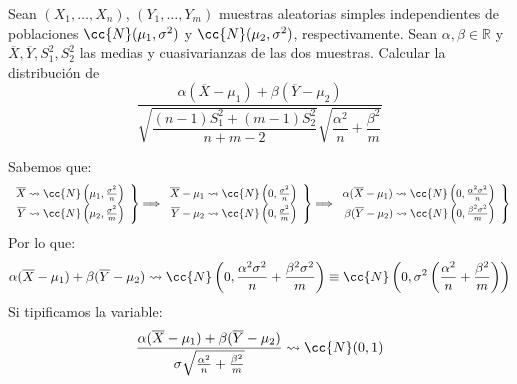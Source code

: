 \begin{ejercicio}
    Sean $(X_1, \ldots, X_n)$, $(Y_1, \ldots, Y_m)$ muestras aleatorias simples independientes de poblaciones $\cc{N}(\mu_1,\sigma^2)$ y $\cc{N}(\mu_2, \sigma^2)$, respectivamente. Sean $\alpha,\beta\in \mathbb{R}$ y $\overline{X},\overline{Y},S_1^2, S_2^2$ las medias y cuasivarianzas de las dos muestras. Calcular la distribución de
    \begin{equation*}
        \dfrac{\alpha\left(\overline{X}-\mu_1\right)+\beta\left(\overline{Y}-\mu_2\right)}{\sqrt{\dfrac{(n-1)S_1^2 + (m-1)S_2^2}{n+m-2}} \sqrt{\dfrac{\alpha^2}{n} + \dfrac{\beta^2}{m}}}
    \end{equation*}

    \noindent
    Sabemos que:
    \begin{equation*}
        \left.\begin{array}{r}
                \overline{X} \rightsquigarrow\cc{N}\left(\mu_1, \frac{\sigma^2}{n}\right) \\
                \overline{Y} \rightsquigarrow\cc{N}\left(\mu_2, \frac{\sigma^2}{m}\right) 
        \end{array}\right\} \Longrightarrow 
        \left.\begin{array}{r}
                \overline{X}-\mu_1 \rightsquigarrow\cc{N}\left(0, \frac{\sigma^2}{n}\right) \\
                \overline{Y}-\mu_2 \rightsquigarrow\cc{N}\left(0, \frac{\sigma^2}{m}\right) 
        \end{array}\right\} \Longrightarrow 
        \left.\begin{array}{r}
                \alpha(\overline{X}-\mu_1 )\rightsquigarrow\cc{N}\left(0, \frac{\alpha^2\sigma^2}{n}\right) \\
                \beta(\overline{Y}-\mu_2 )\rightsquigarrow\cc{N}\left(0, \frac{\beta^2\sigma^2}{m}\right) 
        \end{array}\right\} 
    \end{equation*}
    Por lo que:
    \begin{equation*}
        \alpha(\overline{X}-\mu_1 ) +\beta(\overline{Y}-\mu_2 ) \rightsquigarrow \cc{N}\left(0, \dfrac{\alpha^2\sigma^2}{n} + \dfrac{\beta^2\sigma^2}{m}\right) \equiv \cc{N}\left(0, \sigma^2\left(\frac{\alpha^2}{n}+\frac{\beta^2}{m}\right) \right) 
    \end{equation*}
    Si tipificamos la variable:
    \begin{equation*}
        \dfrac{\alpha(\overline{X}-\mu_1 ) +\beta(\overline{Y}-\mu_2) }{\sigma\sqrt{\frac{\alpha^2}{n}+\frac{\beta^2}{m}}} \rightsquigarrow\cc{N}(0,1)

\end{equation*}
\end{ejercicio}
